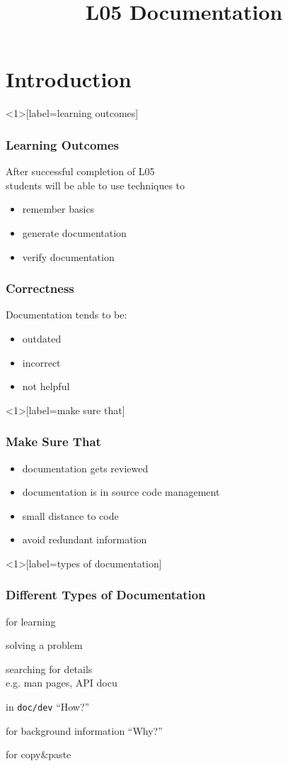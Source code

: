 

\title{L05 Documentation}



\section{Introduction}

\begin{frame}<1>[label=learning outcomes]
	\frametitle{Learning Outcomes}
	After successful completion of L05 \\
	students will be able to
	use techniques to

	\begin{itemize}
	\item remember basics
	\item generate documentation
	\item verify documentation
	\end{itemize}
\end{frame}

\begin{frame}
	\frametitle{Correctness}

	Documentation tends to be:

	\begin{itemize}[<+-| alert@+>]
	\item outdated
	\item incorrect
	\item not helpful
	\end{itemize}
\end{frame}

\begin{frame}<1>[label=make sure that]
	\frametitle{Make Sure That}

	\begin{itemize}[<+-| alert@+>]
	\item documentation gets reviewed
	\item documentation is in source code management
	\item small distance to code
	\item avoid redundant information
	\end{itemize}
\end{frame}

\begin{frame}<1>[label=types of documentation]
	\frametitle{Different Types of Documentation}

	\begin{description}[<+-| alert@+>]
	\item[tutorials] for learning
	\item[how-to] solving a problem
	\item[reference] searching for details \\ e.g. man pages, API docu
	\item[explanations] in \texttt{doc/dev} ``How?''
	\item[decisions] for background information ``Why?''
	\item[examples] for copy\&paste
	\end{description}
\end{frame}

